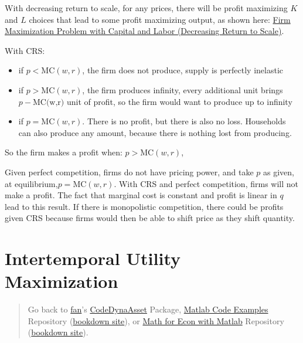\documentclass[
]{book}
\begin{document}
With decreasing return to scale, for any prices, there will be profit
maximizing \(K\) and \(L\) choices that lead to some profit maximizing
output, as shown here: \href{https://fanwangecon.github.io/Math4Econ/matrix_application/KL_borrowhire_firm.html}{Firm Maximization Problem with Capital and Labor
(Decreasing Return to
Scale)}.

With CRS:

\begin{itemize}
\item
  if \(p<\textrm{MC}(w,r)\), the firm does not produce, supply is
  perfectly inelastic
\item
  if \(p>\textrm{MC}(w,r)\), the firm produces infinity, every
  additional unit brings \(p-\textrm{MC(w,r)}\) unit of profit, so the
  firm would want to produce up to infinity
\item
  if \(p=\textrm{MC}(w,r)\). There is no profit, but there is also no
  loss. Households can also produce any amount, because there is
  nothing lost from producing.
\end{itemize}

So the firm makes a profit when: \(p>\textrm{MC}(w,r)\),

Given perfect competition, firms do not have pricing power, and take \(p\)
as given, at equilibrium,\(p=\textrm{MC}(w,r)\). With CRS and perfect
competition, firms will not make a profit. The fact that marginal cost
is constant and profit is linear in \(q\) lead to this result. If there is
monopolistic competition, there could be profits given CRS because firms
would then be able to shift price as they shift quantity.

\hypertarget{intertemporal-utility-maximization}{%
\section{Intertemporal Utility Maximization}\label{intertemporal-utility-maximization}}

\begin{quote}
Go back to \href{http://fanwangecon.github.io/}{fan}'s \href{https://fanwangecon.github.io/CodeDynaAsset/}{CodeDynaAsset} Package, \href{https://fanwangecon.github.io/M4Econ/}{Matlab Code Examples} Repository (\href{https://fanwangecon.github.io/M4Econ/bookdown}{bookdown site}), or \href{https://fanwangecon.github.io/Math4Econ/}{Math for Econ with Matlab} Repository (\href{https://fanwangecon.github.io/Math4Econ/bookdown}{bookdown site}).
\end{quote}
\end{document}
